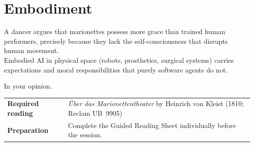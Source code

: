 \chapter{Embodiment}






 A dancer argues that marionettes possess more grace than
trained human performers, precisely because they lack the self-consciousness that disrupts
human movement.\\

 Embodied AI in physical space (robots,
prosthetics, surgical systems) carries expectations and moral responsibilities that purely
software agents do not.

 In your opinion.

\vspace{3.5em}

%
\begin{tabular}{p{3.8cm} p{6.5cm}}
    \textbf{Required reading} &
        \textit{Über das Marionettentheater}\index{Kleist, Heinrich von}\index{Uber das Marionettentheater@\"{U}ber das Marionettentheater}
        by Heinrich von Kleist (1810; Reclam UB~9905) \\[3pt]
    \textbf{Preparation}      &
        Complete the Guided Reading Sheet individually before the session. \\
\end{tabular}

